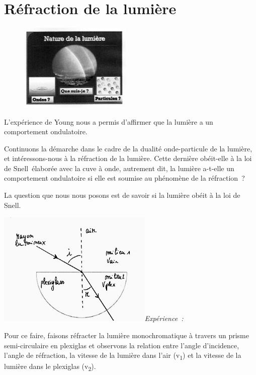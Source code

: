 \section{Réfraction de la lumière}

\begin{figure}
\centering
\includegraphics[width=5.366cm,height=4.175cm]{Pictures/10000001000000F8000000C2693C9AC6103FFED7.png}
\caption{}
\end{figure}

L'expérience de Young nous a permis d'affirmer que la lumière a un
comportement ondulatoire.

Continuons la démarche dans le cadre de la dualité onde-particule de la
lumière, et intéressons-nous à la réfraction de la lumière. Cette
dernière obéit-elle à la loi de Snell~élaborée avec la cuve à onde,
autrement dit, la lumière a-t-elle un comportement ondulatoire si elle
est soumise au phénomène de la réfraction~?

La question que nous nous posons est de savoir si la lumière obéit à la
loi de Snell.

\includegraphics[width=7.398cm,height=5.456cm]{Pictures/100000010000018F0000012698B477377A07703C.png}\emph{Expérience~:
}

Pour ce faire, faisons réfracter la lumière monochromatique à travers un
prisme semi-circulaire en plexiglas et observons la relation entre
l'angle d'incidence, l'angle de réfraction, la vitesse de la lumière
dans l'air (v\textsubscript{1}) et la vitesse de la lumière dans le
plexiglas (v\textsubscript{2}).

